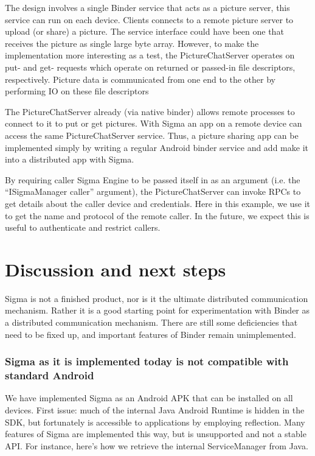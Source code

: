 \documentclass[prodmode]{acmlarge}
\begin{document}
The design involves a single Binder service that acts as a picture server, this service can run on each device. Clients connects to a remote picture server to upload (or share) a picture. The service interface could have been one that receives the picture as single large byte array. However, to make the implementation more interesting as a test, the PictureChatServer operates on put- and get- requests which operate on returned or passed-in file descriptors, respectively. Picture data is communicated from one end to the other by performing IO on these file descriptors

The PictureChatServer already (via native binder) allows remote processes to connect to it to put or get pictures. With Sigma an app on a remote device can access the same PictureChatServer service. Thus, a picture sharing app can be implemented simply by writing a regular Android binder service and add make it into a distributed app with Sigma.

By requiring caller Sigma Engine to be passed itself in as an argument (i.e. the ``ISigmaManager caller'' argument), the PictureChatServer can invoke RPCs to get details about the caller device and credentials. Here in this example, we use it to get the name and protocol of the remote caller. In the future, we expect this is useful to authenticate and restrict callers.

\section{Discussion and next steps}
\label{sec:Discussion}
Sigma is not a finished product, nor is it the ultimate distributed communication mechanism. Rather it is a good starting point for experimentation with Binder as a distributed communication mechanism. There are still some deficiencies that need to be fixed up, and important features of Binder remain unimplemented.

\subsubsection{Sigma as it is implemented today is not compatible with standard Android}
We have implemented Sigma as an Android APK that can be installed on all devices. First issue: much of the internal Java Android Runtime is hidden in the SDK, but fortunately is accessible to applications by employing reflection. Many features of Sigma are implemented this way, but is unsupported and not a stable API. For instance, here's how we retrieve the internal ServiceManager from Java.
\end{document}
